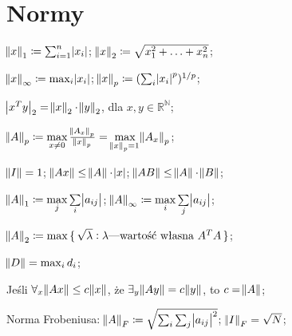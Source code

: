 \section{Normy}


\entry
$\norm{x}_1 \coloneqq \sum^n_{i=1}\abs{x_i}$;
\entry
$\norm{x}_2 \coloneqq \sqrt{x_1^2+\ldots + x_n^2}$;

\entry
$\norm{x}_\infty \coloneqq \max_{i}\abs{x_i}$;
\entry
$\norm{x}_p \coloneqq (\sum_i\abs{x_i}^p)^{1/p}$;

\entry
$\abs{x^Ty}_2=\norm{x}_2\cdot\norm{y}_2$, dla $x,y\in\mathbb{R^N}$;


\entry
$\norm{A}_p \coloneqq \max\limits_{x\neq 0} \frac{\norm{A_x}_p}{\norm{x}_p} = \max\limits_{\norm{x}_p = 1} \norm{A_x}_p$;

\entry
$\norm{I} = 1$;
\entry
$\norm{Ax} \leq \norm{A} \cdot \abs{x}$;
\entry
$\norm{AB} \leq \norm{A} \cdot \norm{B}$;

\entry
$\norm{A}_1 \coloneqq \max\limits_j\sum\limits_i\abs{a_{ij}}$;
\entry
$\norm{A}_\infty \coloneqq \max\limits_i\sum\limits_j\abs{a_{ij}}$;

\entry
$\norm{A}_2 \coloneqq \max\set{\sqrt{\lambda} : \lambda\text{---wartość własna } A^TA}$;

\entry
$\norm{D} = \max_i d_i$;

\entry
Jeśli $\forall_{x} \norm{Ax}\leq c\norm{x}$, że $\exists_y \norm{Ay} = c\norm{y}$, to $c=\norm{A}$;


\entry
Norma Frobeniusa: $\norm{A}_F \coloneqq \sqrt{\sum_i\sum_j\abs{a_{ij}}^2}$; $\norm{I}_F=\sqrt{N}$;



